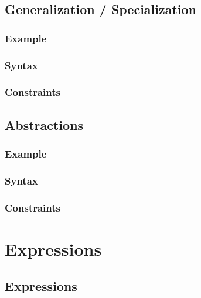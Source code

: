 \documentclass[a4paper,oneside,12pt, extrafontsizes]{memoir}
\begin{document}
  \chapter{Generalization / Specialization}
  \label{ch:generalization}
  

    \section{Example}
    

    \section{Syntax}
    

    \section{Constraints}
    

  \chapter{Abstractions}
  \label{ch:abstract}
  

    \section{Example}
    

    \section{Syntax}
    

    \section{Constraints}
    

\part{Expressions}

  \chapter{Expressions}
  \label{ch:expressions}
  
\end{document}
